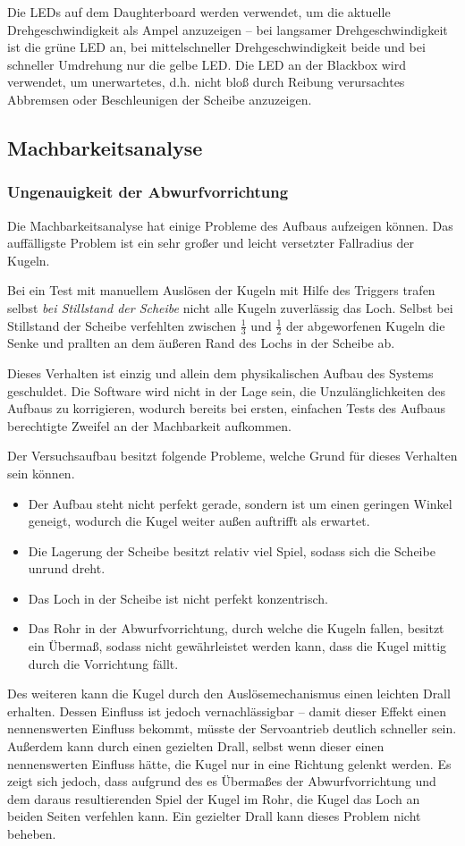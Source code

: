 \documentclass{kis}
\begin{document}
Die LEDs auf dem Daughterboard werden verwendet, um die aktuelle Drehgeschwindigkeit als Ampel anzuzeigen -- bei langsamer Drehgeschwindigkeit ist die grüne LED an, bei mittelschneller Drehgeschwindigkeit beide und bei schneller Umdrehung nur die gelbe LED. Die LED an der Blackbox wird verwendet, um unerwartetes, d.h. nicht bloß durch Reibung verursachtes Abbremsen oder Beschleunigen der Scheibe anzuzeigen.

\subsection{Machbarkeitsanalyse}
\subsubsection{Ungenauigkeit der Abwurfvorrichtung}
Die Machbarkeitsanalyse hat einige Probleme des Aufbaus aufzeigen können. Das auffälligste Problem ist ein sehr großer und leicht versetzter Fallradius der Kugeln.

Bei ein Test mit manuellem Auslösen der Kugeln mit Hilfe des Triggers trafen selbst \emph{bei Stillstand der Scheibe} nicht alle Kugeln zuverlässig das Loch. Selbst bei Stillstand der Scheibe verfehlten zwischen $\frac13$ und $\frac12$ der abgeworfenen Kugeln die Senke und prallten an dem äußeren Rand des Lochs in der Scheibe ab.

Dieses Verhalten ist einzig und allein dem physikalischen Aufbau des Systems geschuldet. Die Software wird nicht in der Lage sein, die Unzulänglichkeiten des Aufbaus zu korrigieren, wodurch bereits bei ersten, einfachen Tests des Aufbaus berechtigte Zweifel an der Machbarkeit aufkommen.

Der Versuchsaufbau besitzt folgende Probleme, welche Grund für dieses Verhalten sein können.
\begin{itemize}
	\item Der Aufbau steht nicht perfekt gerade, sondern ist um einen geringen Winkel geneigt, wodurch die Kugel weiter außen auftrifft als erwartet.
	\item Die Lagerung der Scheibe besitzt relativ viel Spiel, sodass sich die Scheibe unrund dreht.
	\item Das Loch in der Scheibe ist nicht perfekt konzentrisch.
	\item Das Rohr in der Abwurfvorrichtung, durch welche die Kugeln fallen, besitzt ein Übermaß, sodass nicht gewährleistet werden kann, dass die Kugel mittig durch die Vorrichtung fällt.
\end{itemize}
Des weiteren kann die Kugel durch den Auslösemechanismus einen leichten Drall erhalten. Dessen Einfluss ist jedoch vernachlässigbar -- damit dieser Effekt einen nennenswerten Einfluss bekommt, müsste der Servoantrieb deutlich schneller sein. Außerdem kann durch einen gezielten Drall, selbst wenn dieser einen nennenswerten Einfluss hätte, die Kugel nur in eine Richtung gelenkt werden. Es zeigt sich jedoch, dass aufgrund des es Übermaßes der Abwurfvorrichtung und dem daraus resultierenden Spiel der Kugel im Rohr, die Kugel das Loch an beiden Seiten verfehlen kann. Ein gezielter Drall kann dieses Problem nicht beheben.
\end{document}

